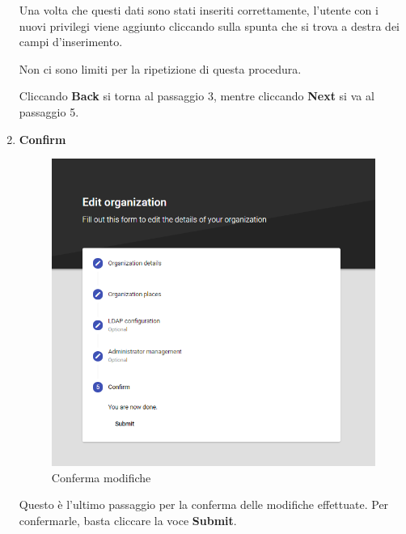 \documentclass[../manuale-utente.tex]{subfiles}
\begin{document}
\begin{enumerate}
    Una volta che questi dati sono stati inseriti correttamente, l'utente con i nuovi privilegi viene aggiunto cliccando sulla spunta che si trova a destra dei campi d'inserimento.

    Non ci sono limiti per la ripetizione di questa procedura.

    Cliccando \textbf{Back} si torna al passaggio 3, mentre cliccando \textbf{Next} si va al passaggio 5.

    \newpage
    \item \textbf{Confirm}
    
    \begin{figure}[H]
        \centering
        \includegraphics[width=120mm]{img/web-app/edit-organization/5-conferma-modifiche.png}
        \caption{Conferma modifiche}%
        \label{fig:web_app_conferma_modifiche}
    \end{figure}

    Questo è l'ultimo passaggio per la conferma delle modifiche effettuate. Per confermarle, basta cliccare la voce \textbf{Submit}.

\end{enumerate}
\newpage

\end{document}
